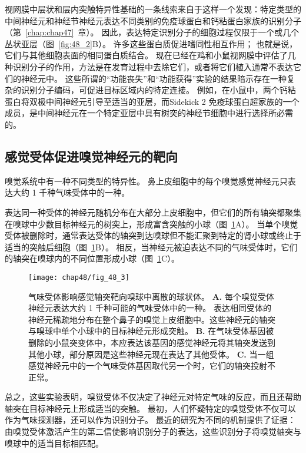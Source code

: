 视网膜中层状和层内突触特异性基础的一条线索来自于这样一个发现：特定类型的中间神经元和神经节神经元表达不同类别的免疫球蛋白和钙粘蛋白家族的识别分子（第~\ref{chap:chap47}~章）。
因此，表达特定识别分子的细胞过程仅限于一个或几个丛状亚层（图~\ref{fig:48_2}B）。
许多这些蛋白质促进嗜同性相互作用；
也就是说，它们与其他细胞表面的相同蛋白质结合。
现在已经在鸡和小鼠视网膜中评估了几种识别分子的作用，方法是在发育过程中去除它们，或者将它们植入通常不表达它们的神经元中。
这些所谓的“功能丧失”和“功能获得”实验的结果暗示存在一种复杂的识别分子编码，可促进目标区域内的特定连接。
例如，在小鼠中，两个钙粘蛋白将双极中间神经元引导至适当的亚层，而Sidekick 2 免疫球蛋白超家族的一个成员，是中间神经元在一个特定亚层中具有树突的神经节细胞中进行选择所必需的。



\subsection{感觉受体促进嗅觉神经元的靶向}

嗅觉系统中有一种不同类型的特异性。
鼻上皮细胞中的每个嗅觉感觉神经元只表达大约 1 千种气味受体中的一种。


表达同一种受体的神经元随机分布在大部分上皮细胞中，但它们的所有轴突都聚集在嗅球中少数目标神经元的树突上，形成富含突触的小球（图~\ref{fig:48_3}A）。
当单个嗅觉受体被删除时，通常表达受体的轴突到达嗅球但不能汇聚到特定的肾小球或终止于适当的突触后细胞（图~\ref{fig:48_3}B）。
相反，当神经元被迫表达不同的气味受体时，它们的轴突在嗅球内的不同位置形成小球（图~\ref{fig:48_3}C）。


\begin{figure}[htbp]
	\centering
	\texttt{[image: chap48/fig\_48\_3]}
	\caption{气味受体影响感觉轴突靶向嗅球中离散的球状体\cite{sanes2009many}。
		\textbf{A.} 每个嗅觉受体神经元表达大约 1 千种可能的气味受体中的一种。
		表达相同受体的神经元稀疏地分布在整个鼻子的嗅觉上皮细胞中。这些神经元的轴突与嗅球中单个小球中的目标神经元形成突触。
		\textbf{B.} 在气味受体基因被删除的小鼠突变体中，本应表达该基因的感觉神经元将其轴突发送到其他小球，部分原因是这些神经元现在表达了其他受体。
		\textbf{C.} 当一组感觉神经元中的一个气味受体基因取代另一个时，它们的轴突投射不正常。}
	\label{fig:48_3}
\end{figure}


总之，这些实验表明，嗅觉受体不仅决定了神经元对特定气味的反应，而且还帮助轴突在目标神经元上形成适当的突触。
最初，人们怀疑特定的嗅觉受体不仅可以作为气味探测器，还可以作为识别分子。
最近的研究为不同的机制提供了证据：
由嗅觉受体激活产生的第二信使影响识别分子的表达，这些识别分子将嗅觉轴突与嗅球中的适当目标相匹配。


